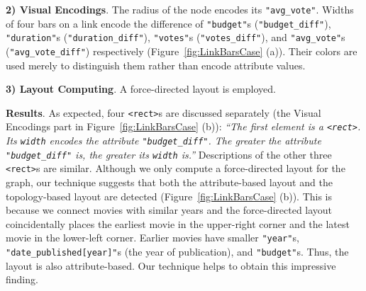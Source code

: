 \noindent \textbf{2) Visual Encodings}.
The radius of the node encodes its \texttt{"avg\_vote"}.
Widths of four bars on a link encode the difference of \texttt{"budget"}s (\texttt{"budget\_diff"}), \texttt{"duration"}s (\texttt{"duration\_diff"}), \texttt{"votes"}s (\texttt{"votes\_diff"}), and \texttt{"avg\_vote"}s (\texttt{"avg\_vote\_diff"}) respectively (Figure~\ref{fig:LinkBarsCase} (a)).
Their colors are used merely to distinguish them rather than encode attribute values.

\noindent \textbf{3) Layout Computing}.
A force-directed layout is employed.

\textbf{Results}.
As expected, four \texttt{<rect>}s are discussed separately (the Visual Encodings part in Figure~\ref{fig:LinkBarsCase} (b)):
\textit{``The first element is a \texttt{<rect>}. Its \texttt{width} encodes the attribute \texttt{"budget\_diff"}. The greater the attribute \texttt{"budget\_diff"} is, the greater its \texttt{width} is.''}
Descriptions of the other three \texttt{<rect>}s are similar.
Although we only compute a force-directed layout for the graph, our technique suggests that both the attribute-based layout and the topology-based layout are detected (Figure~\ref{fig:LinkBarsCase} (b)).
This is because we connect movies with similar years and the force-directed layout coincidentally places the earliest movie in the upper-right corner and the latest movie in the lower-left corner.
Earlier movies have smaller \texttt{"year"}s, \texttt{"date\_published[year]"}s (the year of publication), and \texttt{"budget"}s.
Thus, the layout is also attribute-based.
Our technique helps to obtain this impressive finding.